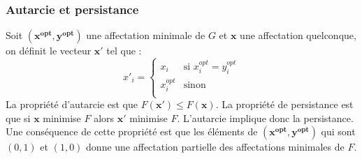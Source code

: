 \documentclass[../main/These_Mathias_Paget.tex]{subfiles}
\begin{document}
	\subsubsection{Autarcie et persistance}
	Soit $(\boldsymbol{x^{opt}},\boldsymbol{y^{opt}})$ une affectation minimale de $G$ et $\boldsymbol{x}$ une affectation quelconque, on définit le vecteur $\boldsymbol{x'}$ tel que :
	\begin{equation}
	\label{eq:transfo_00_11}
		x'_i=\left\{ \begin{array}{ll}
		x_i & \textrm{si $x^{opt}_i=y^{opt}_i$}\\
		x^{opt}_i & \textrm{sinon} \\
		\end{array} \right.
	\end{equation}
	La propriété d’autarcie est que $F(\boldsymbol{x'}) \leq F(\boldsymbol{x})$. La propriété de persistance est que si $\boldsymbol{x}$ minimise $F$ alors $\boldsymbol{x'}$ minimise $F$. L'autarcie implique donc la persistance. Une conséquence de cette propriété est que les éléments de $(\boldsymbol{x^{opt}},\boldsymbol{y^{opt}})$ qui sont $(0,1)$ et $(1,0)$ donne une affectation partielle des affectations minimales de $F$.
	
\end{document}

